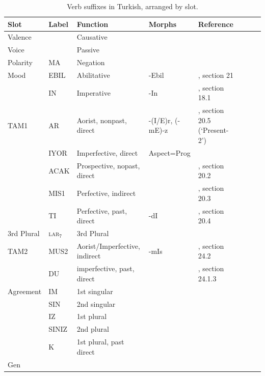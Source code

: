 \documentclass[11pt,letterpaper]{article}
\begin{document}
\begin{table}
\begin{tabular}{llllllll}
Slot & Label & Function & Morphs & Reference \\ \hline
\hline
Valence &   & Causative\\
\hline
Voice &   & Passive\\
\hline
Polarity  & MA & Negation & \\
\hline
Mood  & EBIL & Abilitative & -Ebil & \cite{schaaik2020turkish}, section 21 \\
      & IN   & Imperative & -In & \cite{schaaik2020turkish}, section 18.1 \\
\hline
TAM1      & AR & Aorist, nonpast, direct & -(I/E)r, (-mE)-z  & \cite{schaaik2020turkish}, section 20.5 (`Present-2') \\
          & IYOR & Imperfective, direct & Aspect=Prog\\
          & ACAK & Prospective, nopast, direct & & \cite{schaaik2020turkish}, section 20.2\\
          & MIS1  & Perfective, indirect & & \cite{schaaik2020turkish}, section 20.3\\
          & TI & Perfective, past, direct & -dI & \cite{schaaik2020turkish}, section 20.4\\
\hline
3rd Plural& \textsc{lar}$_{7}$ & 3rd Plural\\
\hline
TAM2      & MUS2 & Aorist/Imperfective, indirect & -mIs & \cite{schaaik2020turkish}, section 24.2 \\
          & DU & imperfective, past, direct &  & \cite{schaaik2020turkish}, section 24.1.3 \\
\hline
Agreement & IM & 1st singular\\
          & SIN &2nd singular\\
          & IZ  & 1st plural\\
          & SINIZ & 2nd plural \\
          & K     & 1st plural, past direct \\
\hline
Gen & \\
\hline
\end{tabular}
\caption{Verb suffixes in Turkish, arranged by slot.}\label{tab:turkish-suffixes}
\end{table}
\end{document}

